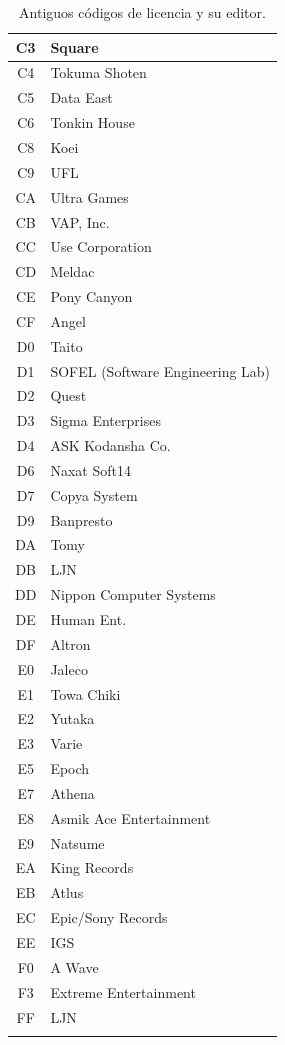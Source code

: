 \begin{longtable}{|c|l|}
C3 & Square \\\hline
C4 & Tokuma Shoten \\\hline
C5 & Data East \\\hline
C6 & Tonkin House \\\hline
C8 & Koei \\\hline
C9 & UFL \\\hline
CA & Ultra Games \\\hline
CB & VAP, Inc. \\\hline
CC & Use Corporation \\\hline
CD & Meldac \\\hline
CE & Pony Canyon \\\hline
CF & Angel \\\hline
D0 & Taito \\\hline
D1 & SOFEL (Software Engineering Lab) \\\hline
D2 & Quest \\\hline
D3 & Sigma Enterprises \\\hline
D4 & ASK Kodansha Co. \\\hline
D6 & Naxat Soft14 \\\hline
D7 & Copya System \\\hline
D9 & Banpresto \\\hline
DA & Tomy \\\hline
DB & LJN \\\hline
DD & Nippon Computer Systems \\\hline
DE & Human Ent. \\\hline
DF & Altron \\\hline
E0 & Jaleco \\\hline
E1 & Towa Chiki \\\hline
E2 & Yutaka \\\hline
E3 & Varie \\\hline
E5 & Epoch \\\hline
E7 & Athena \\\hline
E8 & Asmik Ace Entertainment \\\hline
E9 & Natsume \\\hline
EA & King Records \\\hline
EB & Atlus \\\hline
EC & Epic/Sony Records \\\hline
EE & IGS \\\hline
F0 & A Wave \\\hline
F3 & Extreme Entertainment \\\hline
FF & LJN \\\hline
\caption{Antiguos códigos de licencia y su editor.}
\end{longtable}

